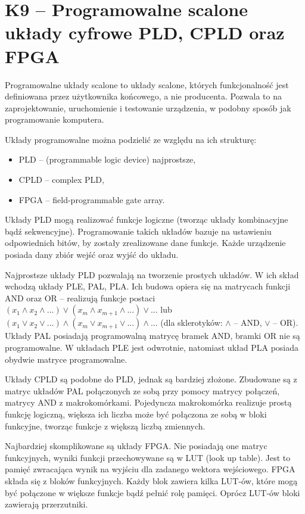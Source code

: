 \sloppy\section{K9 -- Programowalne scalone układy cyfrowe PLD, CPLD oraz FPGA}

Programowalne układy scalone to układy scalone, których funkcjonalność jest definiowana przez użytkownika końcowego, a nie producenta. Pozwala to na zaprojektowanie, uruchomienie i testowanie urządzenia, w podobny sposób jak programowanie komputera.

Układy programowalne można podzielić ze względu na ich strukturę:
\begin{itemize}
\item PLD -- (programmable logic device) najprostsze,
\item CPLD -- complex PLD,
\item FPGA -- field-programmable gate array.
\end{itemize}

Układy PLD mogą realizować funkcje logiczne (tworząc układy kombinacyjne bądź sekwencyjne). Programowanie takich układów bazuje na ustawieniu odpowiednich bitów, by zostały zrealizowane dane funkcje. Każde urządzenie posiada dany zbiór wejść oraz wyjść do układu.

Najprostsze układy PLD pozwalają na tworzenie prostych układów. W ich skład wchodzą układy PLE, PAL, PLA. Ich budowa opiera się na matrycach funkcji AND oraz OR -- realizują funkcje postaci $(x_{1} \wedge x_{2} \wedge ...) \vee (x_{m} \wedge x_{m+1} \wedge ...) \vee ...$ lub $(x_{1} \vee x_{2} \vee ...) \wedge (x_{m} \vee x_{m+1} \vee ...) \wedge ...$ (dla sklerotyków: $\wedge$ -- AND, $\vee$ -- OR). Układy PAL posiadają programowalną matrycę bramek AND, bramki OR nie są programowalne. W układach PLE jest odwrotnie, natomiast układ PLA posiada obydwie matryce programowalne.

Układy CPLD są podobne do PLD, jednak są bardziej złożone. Zbudowane są z matryc układów PAL połączonych ze sobą przy pomocy matrycy połączeń, matrycy AND z makrokomórkami. Pojedyncza makrokomórka realizuje prostą funkcję logiczną, większa ich liczba może być połączona ze sobą w bloki funkcyjne, tworząc funkcje z większą liczbą zmiennych. 

Najbardziej skomplikowane są układy FPGA. Nie posiadają one matryc funkcyjnych, wyniki funkcji przechowywane są w LUT (look up table). Jest to pamięć zwracająca wynik na wyjściu dla zadanego wektora wejściowego. FPGA składa się z bloków funkcyjnych. Każdy blok zawiera kilka LUT-ów, które mogą być połączone w większe funkcje bądź pełnić rolę pamięci. Oprócz LUT-ów bloki zawierają przerzutniki. 

